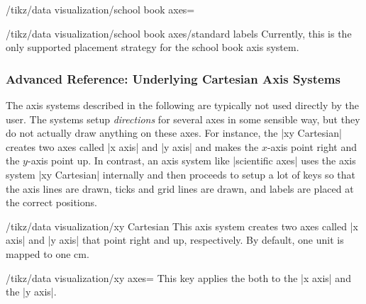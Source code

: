 \begin{key}{/tikz/data visualization/school book axes=}
\begin{key}{/tikz/data visualization/school book axes/standard labels}
        Currently, this is the only supported placement strategy for the school
        book axis system.
\begin{codeexample}[]
\end{codeexample}
    \end{key}
\end{key}


\subsubsection{Advanced Reference: Underlying Cartesian Axis Systems}

The axis systems described in the following are typically not used directly by
the user. The systems setup \emph{directions} for several axes in some sensible
way, but they do not actually draw anything on these axes. For instance, the
|xy Cartesian| creates two axes called |x axis| and |y axis| and makes the
$x$-axis point right and the $y$-axis point up. In contrast, an axis system
like |scientific axes| uses the axis system |xy Cartesian| internally and then
proceeds to setup a lot of keys so that the axis lines are drawn, ticks and
grid lines are drawn, and labels are placed at the correct positions.

\begin{key}{/tikz/data visualization/xy Cartesian}
    This axis system creates two axes called |x axis| and |y axis| that point
    right and up, respectively. By default, one unit is mapped to one cm.
\begin{codeexample}[]
\end{codeexample}

    \begin{key}{/tikz/data visualization/xy axes=}
        This key applies the  both to the |x axis| and the
        |y axis|.
    \end{key}
\end{key}

